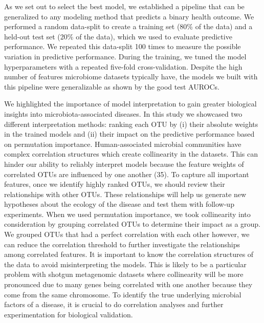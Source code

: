\documentclass[11pt,]{article}
\begin{document}
As we set out to select the best model, we established a pipeline that
can be generalized to any modeling method that predicts a binary health
outcome. We performed a random data-split to create a training set (80\%
of the data) and a held-out test set (20\% of the data), which we used
to evaluate predictive performance. We repeated this data-split 100
times to measure the possible variation in predictive performance.
During the training, we tuned the model hyperparameters with a repeated
five-fold cross-validation. Despite the high number of features
microbiome datasets typically have, the models we built with this
pipeline were generalizable as shown by the good test AUROCs.

We highlighted the importance of model interpretation to gain greater
biological insights into microbiota-associated diseases. In this study
we showcased two different interpretation methods: ranking each OTU by
(i) their absolute weights in the trained models and (ii) their impact
on the predictive performance based on permutation importance.
Human-associated microbial communities have complex correlation
structures which create collinearity in the datasets. This can hinder
our ability to reliably interpret models because the feature weights of
correlated OTUs are influenced by one another (35). To capture all
important features, once we identify highly ranked OTUs, we should
review their relationships with other OTUs. These relationships will
help us generate new hypotheses about the ecology of the disease and
test them with follow-up experiments. When we used permutation
importance, we took collinearity into consideration by grouping
correlated OTUs to determine their impact as a group. We grouped OTUs
that had a perfect correlation with each other however, we can reduce
the correlation threshold to further investigate the relationships among
correlated features. It is important to know the correlation structures
of the data to avoid misinterpreting the models. This is likely to be a
particular problem with shotgun metagenomic datasets where collinearity
will be more pronounced due to many genes being correlated with one
another because they come from the same chromosome. To identify the true
underlying microbial factors of a disease, it is crucial to do
correlation analyses and further experimentation for biological
validation.
\end{document}
